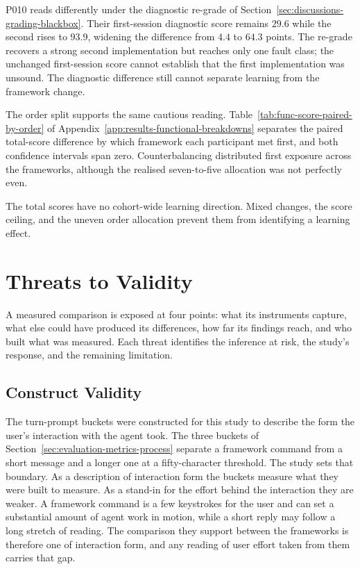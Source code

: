 P010 reads differently under the diagnostic re-grade of Section~\ref{sec:discussions-grading-blackbox}. Their first-session diagnostic score remains $29.6$ while the second rises to $93.9$, widening the difference from $4.4$ to $64.3$ points. The re-grade recovers a strong second implementation but reaches only one fault class; the unchanged first-session score cannot establish that the first implementation was unsound. The diagnostic difference still cannot separate learning from the framework change.

The order split supports the same cautious reading. Table~\ref{tab:func-score-paired-by-order} of Appendix~\ref{app:results-functional-breakdowns} separates the paired total-score difference by which framework each participant met first, and both confidence intervals span zero. Counterbalancing distributed first exposure across the frameworks, although the realised seven-to-five allocation was not perfectly even.

The total scores have no cohort-wide learning direction. Mixed changes, the score ceiling, and the uneven order allocation prevent them from identifying a learning effect.

\section{Threats to Validity}
\label{sec:discussions-threats}

A measured comparison is exposed at four points: what its instruments capture, what else could have produced its differences, how far its findings reach, and who built what was measured. Each threat identifies the inference at risk, the study's response, and the remaining limitation.

\subsection{Construct Validity}

The turn-prompt buckets were constructed for this study to describe the form the user's interaction with the agent took. The three buckets of Section~\ref{sec:evaluation-metrics-process} separate a framework command from a short message and a longer one at a fifty-character threshold. The study sets that boundary. As a description of interaction form the buckets measure what they were built to measure. As a stand-in for the effort behind the interaction they are weaker. A framework command is a few keystrokes for the user and can set a substantial amount of agent work in motion, while a short reply may follow a long stretch of reading. The comparison they support between the frameworks is therefore one of interaction form, and any reading of user effort taken from them carries that gap.

